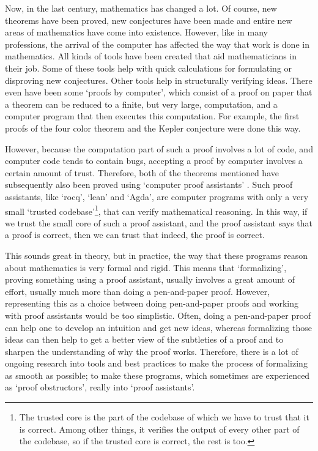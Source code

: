 Now, in the last century, mathematics has changed a lot. Of course, new theorems have been proved, new conjectures have been made and entire new areas of mathematics have come into existence. However, like in many professions, the arrival of the computer has affected the way that work is done in mathematics. All kinds of tools have been created that aid mathematicians in their job. Some of these tools help with quick calculations for formulating or disproving new conjectures. Other tools help in structurally verifying ideas. There even have been some `proofs by computer', which consist of a proof on paper that a theorem can be reduced to a finite, but very large, computation, and a computer program that then executes this computation. For example, the first proofs of the four color theorem \autocite{four-color-theorem} and the Kepler conjecture \autocite{Kepler-conjecture} were done this way.

However, because the computation part of such a proof involves a lot of code, and computer code tends to contain bugs, accepting a proof by computer involves a certain amount of trust. Therefore, both of the theorems mentioned have subsequently also been proved using `computer proof assistants' \autocite{formalized-four-color-theorem, formalized-Kepler-conjecture}. Such proof assistants, like `rocq', `lean' and `Agda', are computer programs with only a very small `trusted codebase'\footnote{The trusted core is the part of the codebase of which we have to trust that it is correct. Among other things, it verifies the output of every other part of the codebase, so if the trusted core is correct, the rest is too.}, that can verify mathematical reasoning. In this way, if we trust the small core of such a proof assistant, and the proof assistant says that a proof is correct, then we can trust that indeed, the proof is correct.

This sounds great in theory, but in practice, the way that these programs reason about mathematics is very formal and rigid. This means that `formalizing', proving something using a proof assistant, usually involves a great amount of effort, usually much more than doing a pen-and-paper proof. However, representing this as a choice between doing pen-and-paper proofs and working with proof assistants would be too simplistic. Often, doing a pen-and-paper proof can help one to develop an intuition and get new ideas, whereas formalizing those ideas can then help to get a better view of the subtleties of a proof and to sharpen the understanding of why the proof works. Therefore, there is a lot of ongoing research into tools and best practices to make the process of formalizing as smooth as possible; to make these programs, which sometimes are experienced as `proof obstructors', really into `proof assistants'.

